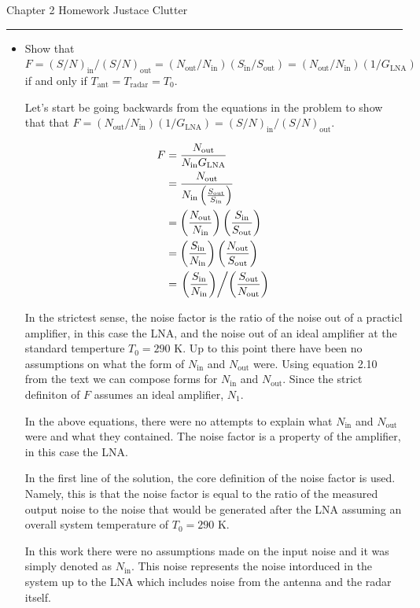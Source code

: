 \documentclass[letterpaper,10pt]{article}\usepackage[]{graphicx}\usepackage[]{color}
\newcommand{\question}[3]{
\begin{itemize}
\item[{\makebox[1cm]{#1)}}] #2

\vspace{.2in}

#3

\end{itemize}

\vspace{.2in}
}
\begin{document}
{\large Chapter 2 Homework}
\hfill
{\large Justace Clutter}

\vspace{.1in}

\hrule

\vspace{.5in}

\question{2.1}{
Show that $F=(S/N)_{\text{in}}/(S/N)_{\text{out}}=(N_\text{out}/N_\text{in})(S_\text{in}/S_\text{out})=(N_\text{out}/N_\text{in})(1/G_\text{LNA})$ if and only if $T_\text{ant}=T_\text{radar}=T_0$.
}{

Let's start be going backwards from the equations in the problem to show that that $F = (N_\text{out}/N_\text{in})(1/G_\text{LNA}) = (S/N)_{\text{in}}/(S/N)_{\text{out}}$.  

\begin{align*}
F & = \frac{N_\text{out}}{N_\text{in}G_\text{LNA}} \\
  & = \frac{N_\text{out}}{N_\text{in}\left(\frac{S_\text{out}}{S_\text{in}}\right)} \\
  & = \left(\frac{N_\text{out}}{N_\text{in}}\right)\left(\frac{S_\text{in}}{S_\text{out}}\right) \\
  & = \left(\frac{S_\text{in}}{N_\text{in}}\right)\left(\frac{N_\text{out}}{S_\text{out}}\right) \\
  & = \left.\left(\frac{S_\text{in}}{N_\text{in}}\right)\middle/\left(\frac{S_\text{out}}{N_\text{out}}\right)\right.
\end{align*}

In the strictest sense, the noise factor is the ratio of the noise out of a practicl amplifier, in this case the LNA, and the noise out of an ideal amplifier at the standard temperture $T_0=290$ K.  Up to this point there have been no assumptions on what the form of $N_\text{in}$ and $N_\text{out}$ were.  Using equation 2.10 from the text we can compose forms for $N_\text{in}$ and $N_\text{out}$.  Since the strict definiton of $F$ assumes an ideal amplifier, $N_1$.

In the above equations, there were no attempts to explain what $N_\text{in}$ and $N_\text{out}$ were and what they contained.  The noise factor is a property of the amplifier, in this case the LNA.  

In the first line of the solution, the core definition of the noise factor is used.  Namely, this is that the noise factor is equal to the ratio of the measured output noise to the noise that would be generated after the LNA assuming an overall system temperature of $T_0=290$ K.  


In this work there were no assumptions made on the input noise and it was simply denoted as $N_\text{in}$.  This noise represents the noise intorduced in the system up to the LNA which includes noise from the antenna and the radar itself.  

}
\end{document}
